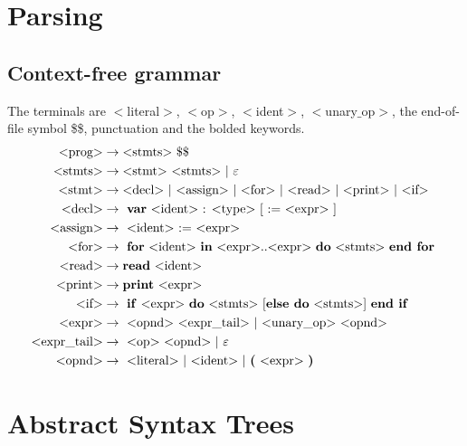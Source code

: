 \documentclass[a4paper]{article}
\begin{document}
\section{Parsing}

\subsection{Context-free grammar}


\newcommand{\cfgvar}[1]{$<$#1$>$}
\newcommand{\cfgrule}[2]{\text{\cfgvar{#1}} &\rightarrow \text{#2}}
\newcommand{\cfgterm}[1]{\textbf{#1}}
The terminals are \cfgvar{literal}, \cfgvar{op}, \cfgvar{ident}, 
\cfgvar{unary$\_$op}, the end-of-file symbol \$\$, punctuation 
and the bolded keywords.
\begin{align*}
  \cfgrule{prog}{\cfgvar{stmts} \$\$} \\
  \cfgrule{stmts}{\cfgvar{stmt} \cfgvar{stmts} $\mid$ $\varepsilon$} \\
  \cfgrule{stmt}{\cfgvar{decl} $\mid$ 
                 \cfgvar{assign} $\mid$
                 \cfgvar{for} $\mid$ 
                 \cfgvar{read} $\mid$ 
                 \cfgvar{print} $\mid$ 
                 \cfgvar{if} } \\
  \cfgrule{decl}{
    \cfgterm{var} \cfgvar{ident} : \cfgvar{type} [ := \cfgvar{expr} ]
  } \\
  \cfgrule{assign}{
    \cfgvar{ident} := \cfgvar{expr}
  } \\
  \cfgrule{for}{
    \cfgterm{for} \cfgvar{ident} \cfgterm{in} 
    \cfgvar{expr}..\cfgvar{expr} \cfgterm{do} \cfgvar{stmts} 
    \cfgterm{end for}
  } \\
  \cfgrule{read}{\cfgterm{read} \cfgvar{ident}} \\
  \cfgrule{print}{\cfgterm{print} \cfgvar{expr}} \\ 
  \cfgrule{if}{
    \cfgterm{if} \cfgvar{expr} \cfgterm{do} \cfgvar{stmts}
    [\cfgterm{else do} \cfgvar{stmts}] \cfgterm{end if}
  } \\
  \cfgrule{expr}{ 
    \cfgvar{opnd} \cfgvar{expr$\_$tail} 
    $\mid$ \cfgvar{unary$\_$op} \cfgvar{opnd}
  } \\
  \cfgrule{expr$\_$tail}{
    \cfgvar{op} \cfgvar{opnd} $\mid$ $\varepsilon$
  } \\
  \cfgrule{opnd}{
    \cfgvar{literal} $\mid$ \cfgvar{ident} 
    $\mid$ \cfgterm{(} \cfgvar{expr} \cfgterm{)}
  } \\
\end{align*}

\section{Abstract Syntax Trees}
\end{document}
